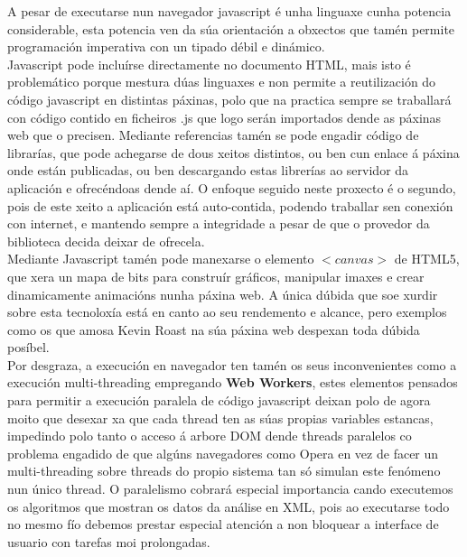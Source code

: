         A pesar de executarse nun navegador javascript é unha linguaxe cunha potencia 
        considerable, esta potencia ven da súa orientación a obxectos que tamén permite 
        programación imperativa con un tipado débil e dinámico.\\
        
        Javascript pode incluírse directamente no documento HTML, mais isto é problemático 
        porque mestura dúas linguaxes e non permite a reutilización do código javascript en
        distintas páxinas, polo que na practica sempre se traballará con código contido en
        ficheiros .js que logo serán importados dende as páxinas web que o precisen. Mediante 
        referencias tamén se pode engadir código de librarías, que pode achegarse de dous xeitos
        distintos, ou ben cun enlace á páxina onde están publicadas, ou ben descargando estas
        librerías ao servidor da aplicación e ofrecéndoas dende aí. O enfoque seguido neste 
        proxecto é o segundo, pois de este xeito a aplicación está auto-contida, podendo traballar
        sen conexión con internet, e mantendo sempre a integridade a pesar de que o provedor
        da biblioteca decida deixar de ofrecela.\\
        
        Mediante Javascript tamén pode manexarse o elemento $<canvas>$ de HTML5, que xera un mapa
        de bits para construír gráficos, manipular imaxes e crear dinamicamente animacións nunha
        páxina web. A única dúbida que soe xurdir sobre esta tecnoloxía está en canto ao seu 
        rendemento e alcance, pero exemplos como os que amosa Kevin Roast na súa páxina 
        web\cite{kevin-roast-canvas-examples} despexan toda dúbida posíbel.\\
        
        Por desgraza, a execución en navegador ten tamén os seus inconvenientes como a execución 
        multi-threading empregando \textbf{Web Workers}, estes elementos pensados para permitir
        a execución paralela de código javascript deixan polo de agora moito que desexar xa que 
        cada thread ten as súas propias variables estancas, impedindo polo tanto o acceso á 
        arbore DOM dende threads paralelos co problema engadido de que algúns navegadores como 
        Opera en vez de facer un multi-threading sobre threads do propio sistema  tan só simulan
        este fenómeno nun único thread. O paralelismo cobrará especial importancia 
        cando executemos os algoritmos que mostran os datos da análise en XML, pois ao 
        executarse todo no mesmo fío debemos prestar especial atención a non bloquear a 
        interface de usuario con tarefas moi prolongadas.\\
    

